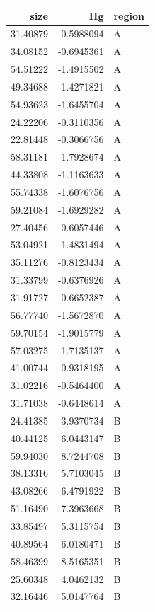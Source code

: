 \documentclass[
  letterpaper,
  DIV=11,
  numbers=noendperiod]{scrartcl}
\begin{document}
\begin{table}
\centering
\begin{tabular}[t]{r|r|l}
\hline
size & Hg & region\\
\hline
31.40879 & -0.5988094 & A\\
\hline
34.08152 & -0.6945361 & A\\
\hline
54.51222 & -1.4915502 & A\\
\hline
49.34688 & -1.4271821 & A\\
\hline
54.93623 & -1.6455704 & A\\
\hline
24.22206 & -0.3110356 & A\\
\hline
22.81448 & -0.3066756 & A\\
\hline
58.31181 & -1.7928674 & A\\
\hline
44.33808 & -1.1163633 & A\\
\hline
55.74338 & -1.6076756 & A\\
\hline
59.21084 & -1.6929282 & A\\
\hline
27.40456 & -0.6057446 & A\\
\hline
53.04921 & -1.4831494 & A\\
\hline
35.11276 & -0.8123434 & A\\
\hline
31.33799 & -0.6376926 & A\\
\hline
31.91727 & -0.6652387 & A\\
\hline
56.77740 & -1.5672870 & A\\
\hline
59.70154 & -1.9015779 & A\\
\hline
57.03275 & -1.7135137 & A\\
\hline
41.00744 & -0.9318195 & A\\
\hline
31.02216 & -0.5464400 & A\\
\hline
31.71038 & -0.6448614 & A\\
\hline
24.41385 & 3.9370734 & B\\
\hline
40.44125 & 6.0443147 & B\\
\hline
59.94030 & 8.7244708 & B\\
\hline
38.13316 & 5.7103045 & B\\
\hline
43.08266 & 6.4791922 & B\\
\hline
51.16490 & 7.3963668 & B\\
\hline
33.85497 & 5.3115754 & B\\
\hline
40.89564 & 6.0180471 & B\\
\hline
58.46399 & 8.5165351 & B\\
\hline
25.60348 & 4.0462132 & B\\
\hline
32.16446 & 5.0147764 & B\\

\end{tabular}
\end{table}
\end{document}
